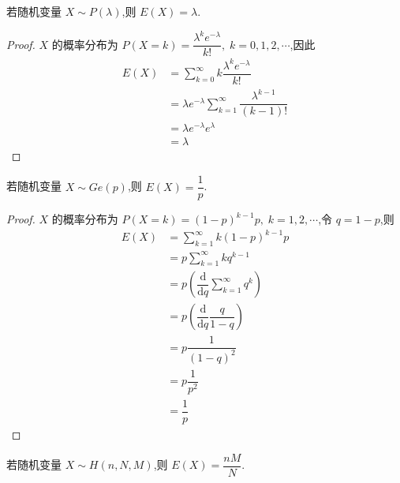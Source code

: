 \begin{conclusion}
    \indent 若随机变量 $X \sim P(\lambda)$,则 $E(X) = \lambda$.
\end{conclusion}

\begin{proof}
    $X$ 的概率分布为 $P(X=k) = \dfrac{\lambda^k e^{-\lambda}}{k!}, \; k=0,1,2,\cdots$,因此
    $$
    \begin{aligned}
        E(X) &= \sum_{k=0}^{\infty} k \dfrac{\lambda^k e^{-\lambda}}{k!} \\
        &= \lambda e^{-\lambda} \sum_{k=1}^{\infty} \dfrac{\lambda^{k-1}}{(k-1)!} \\
        &= \lambda e^{-\lambda} e^{\lambda} \\
        &= \lambda
    \end{aligned}
    $$
\end{proof}

\begin{conclusion}
    \indent 若随机变量 $X \sim Ge(p)$,则 $E(X) = \dfrac{1}{p}$.
\end{conclusion}

\begin{proof}
    $X$ 的概率分布为 $P(X=k) = (1-p)^{k-1} p, \; k=1,2,\cdots$,令 $q=1-p$,则
    $$
    \begin{aligned}
        E(X) &= \sum_{k=1}^{\infty} k (1-p)^{k-1} p \\
        &= p \sum_{k=1}^{\infty} k q^{k-1} \\
        &= p \left( \dfrac{\text{d}}{\text{d}q} \sum_{k=1}^{\infty} q^k \right) \\
        &= p \left( \dfrac{\text{d}}{\text{d}q} \dfrac{q}{1-q} \right) \\
        &= p \dfrac{1}{(1-q)^2} \\
        &= p \dfrac{1}{p^2} \\
        &= \dfrac{1}{p}
    \end{aligned}
    $$
\end{proof}

\begin{conclusion}
    \indent 若随机变量 $X \sim H(n,N,M)$,则 $E(X) = \dfrac{nM}{N}$.
\end{conclusion}

